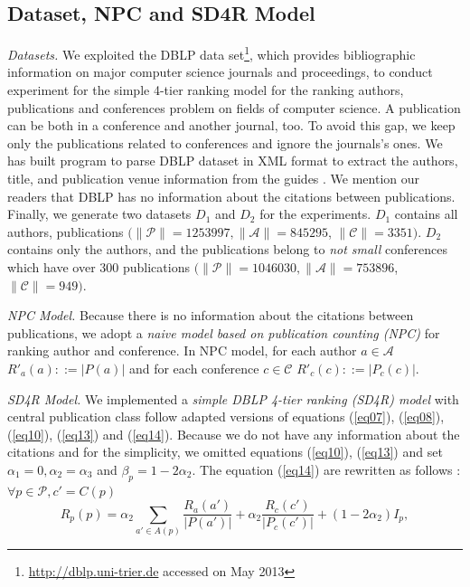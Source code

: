 \documentclass[lnicst]{svmultln}
\begin{document}
\subsection{Dataset, NPC and SD4R Model}
\textit{Datasets.} We exploited the DBLP data set\footnote{\url{http://dblp.uni-trier.de} accessed on May 2013}, which provides bibliographic information on major computer science journals and proceedings,  to conduct experiment for the simple 4-tier ranking model for the ranking authors, publications and conferences problem on fields of computer science.  A publication can be both in a conference and another journal, too.  To avoid this gap, we keep only the publications related to conferences and ignore the journals's ones. We has built program to parse DBLP dataset in XML format to extract the authors, title, and publication venue information from the guides \cite{MichaelLey06,MichaelLey09}.  We mention our readers that DBLP has no information about the citations between publications.  Finally, we generate two datasets $D_1$ and $D_2$ for the experiments. $D_1$ contains all authors, publications  $(\|\mathcal{P}\|= 1253997,  \|\mathcal{A}\|= 845295$, $\|\mathcal{C}\|=3351)$. $D_2$ contains only the authors, and the publications belong to \textit{not small} conferences which have over 300 publications $(\|\mathcal{P}\|=1046030,  \|\mathcal{A}\|= 753896$, $\|\mathcal{C}\|=949)$.

\textit{NPC Model.} Because there is no information about the citations between publications, we adopt a \textit{naive model based on publication counting (NPC)} for ranking author and conference. In NPC model, for each author $a \in \mathcal{A}$  $R'_a(a) ::= |P(a)| $ and for each conference $c \in \mathcal{C}$  $R'_c(c) ::= |P_c(c)|$.

\textit{SD4R Model.} We implemented a \textit{simple DBLP 4-tier ranking (SD4R) model} with central publication class follow adapted versions of equations (\ref{eq07}), (\ref{eq08}), (\ref{eq10}), (\ref{eq13}) and (\ref{eq14}).  
Because we do not have any information about the citations and for the simplicity, we omitted equations (\ref{eq10}), (\ref{eq13}) and set $\alpha_1=0, \alpha_2=\alpha_3$ and $\beta_p = 1-2\alpha_2 $.  The equation (\ref{eq14}) are rewritten as follows :$\forall p\in\mathcal{P}, c' = C(p)$\
\begin{equation}\label{eq15}
R_p(p) = \alpha_2\sum_{a'\in A(p)}\frac{R_a(a')}{|P(a')|} + \alpha_2\frac{R_c(c')}{|P_c(c')|} + (1-2\alpha_2)I_p,
\end{equation}
\end{document}
